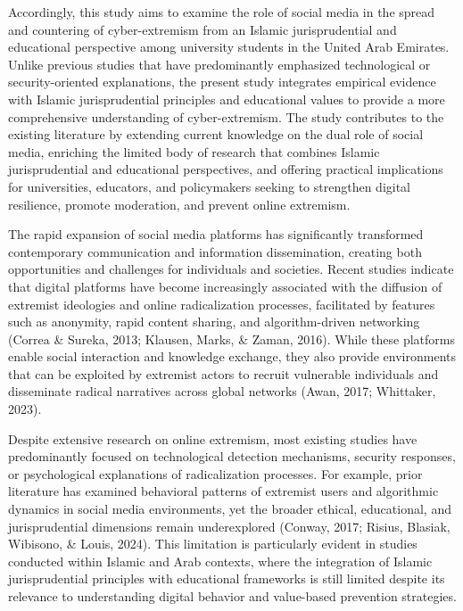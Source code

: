 \documentclass{NSP1}
\begin{document}
Accordingly, this study aims to examine the role of social media in the spread and countering of cyber-extremism from an Islamic jurisprudential and educational perspective among university students in the United Arab Emirates. Unlike previous studies that have predominantly emphasized technological or security-oriented explanations, the present study integrates empirical evidence with Islamic jurisprudential principles and educational values to provide a more comprehensive understanding of cyber-extremism. The study contributes to the existing literature by extending current knowledge on the dual role of social media, enriching the limited body of research that combines Islamic jurisprudential and educational perspectives, and offering practical implications for universities, educators, and policymakers seeking to strengthen digital resilience, promote moderation, and prevent online extremism.

\par\medskip{}\smallskip

The rapid expansion of social media platforms has significantly transformed contemporary communication and information dissemination, creating both opportunities and challenges for individuals and societies. Recent studies indicate that digital platforms have become increasingly associated with the diffusion of extremist ideologies and online radicalization processes, facilitated by features such as anonymity, rapid content sharing, and algorithm-driven networking (Correa \& Sureka, 2013; Klausen, Marks, \& Zaman, 2016). While these platforms enable social interaction and knowledge exchange, they also provide environments that can be exploited by extremist actors to recruit vulnerable individuals and disseminate radical narratives across global networks (Awan, 2017; Whittaker, 2023).

Despite extensive research on online extremism, most existing studies have predominantly focused on technological detection mechanisms, security responses, or psychological explanations of radicalization processes. For example, prior literature has examined behavioral patterns of extremist users and algorithmic dynamics in social media environments, yet the broader ethical, educational, and jurisprudential dimensions remain underexplored (Conway, 2017; Risius, Blasiak, Wibisono, \& Louis, 2024). This limitation is particularly evident in studies conducted within Islamic and Arab contexts, where the integration of Islamic jurisprudential principles with educational frameworks is still limited despite its relevance to understanding digital behavior and value-based prevention strategies.
\end{document}
